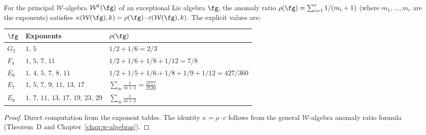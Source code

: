 \begin{proposition}%
\label{prop:exceptional-anomaly-ratios}
For the principal $\mathcal{W}$-algebra $\mathcal{W}^k(\fg)$ of
an exceptional Lie algebra $\fg$, the anomaly ratio
$\rho(\fg) = \sum_{i=1}^r 1/(m_i + 1)$
\textup{(}where $m_1, \ldots, m_r$ are the exponents\textup{)}
satisfies $\kappa(\mathcal{W}(\fg), k) = \rho(\fg) \cdot c(\mathcal{W}(\fg), k)$.
The explicit values are:
\begin{center}
\renewcommand{\arraystretch}{1.3}
\begin{tabular}{lll}
\toprule
$\fg$ & Exponents & $\rho(\fg)$ \\
\midrule
$G_2$ & $1,\, 5$ & $1/2 + 1/6 = 2/3$ \\
$F_4$ & $1,\, 5,\, 7,\, 11$ & $1/2 + 1/6 + 1/8 + 1/12 = 7/8$ \\
$E_6$ & $1,\, 4,\, 5,\, 7,\, 8,\, 11$ & $1/2 + 1/5 + 1/6 + 1/8 + 1/9 + 1/12 = 427/360$ \\
$E_7$ & $1,\, 5,\, 7,\, 9,\, 11,\, 13,\, 17$ & $\displaystyle\sum_{m} \tfrac{1}{m+1} = \tfrac{2777}{2520}$ \\[4pt]
$E_8$ & $1,\, 7,\, 11,\, 13,\, 17,\, 19,\, 23,\, 29$ & $\displaystyle\sum_m \tfrac{1}{m+1}$ \\
\bottomrule
\end{tabular}
\end{center}
\end{proposition}

\begin{proof}
Direct computation from the exponent tables. The identity
$\kappa = \rho \cdot c$ follows from the general $\mathcal{W}$-algebra
anomaly ratio formula (Theorem~D and
Chapter~\ref{chap:w-algebras}).
\end{proof}

